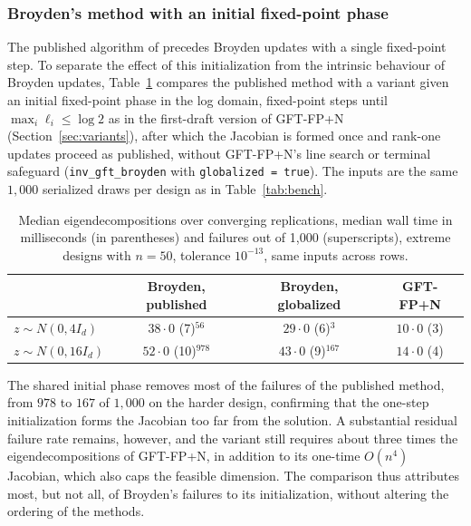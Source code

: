 \documentclass[11pt]{article}
\begin{document}
\subsubsection{Broyden's method with an initial fixed-point phase}\label{sec:s5}

The published algorithm of \citet{ChenFeiYu:2025} precedes Broyden
updates with a single fixed-point step. To separate the effect of this
initialization from the intrinsic behaviour of Broyden updates,
Table~\ref{tab:glob} compares the published method with a variant given
an initial fixed-point phase in the log domain, fixed-point steps
until $\max_i\ell_i\leq\log2$ as in the first-draft version of
GFT-FP+N (Section~\ref{sec:variants}), after which the Jacobian is
formed once and rank-one updates proceed as published, without
GFT-FP+N's line search or terminal safeguard
(\texttt{inv\_gft\_broyden} with \texttt{globalized = true}). The
inputs are the same $1{,}000$ serialized draws per design as in
Table~\ref{tab:bench}.

\begin{table}[h]
\centering
\caption{Median eigendecompositions over converging replications, median
wall time in milliseconds (in parentheses) and failures out of
1{,}000 (superscripts), extreme designs with $n=50$, tolerance
$10^{-13}$, same inputs across rows.}\label{tab:glob}
\medskip
\begin{tabular}{lccc}
\toprule
 & Broyden, published & Broyden, globalized & GFT-FP+N\\
\midrule
$z\sim N(0,4I_d)$  & $38{\cdot}0$ (7)$^{56}$  & $29{\cdot}0$ (6)$^{3}$   & $10{\cdot}0$ (3)\\
$z\sim N(0,16I_d)$ & $52{\cdot}0$ (10)$^{978}$ & $43{\cdot}0$ (9)$^{167}$ & $14{\cdot}0$ (4)\\
\bottomrule
\end{tabular}
\end{table}

The shared initial phase removes most of the failures of the published
method, from $978$ to $167$ of $1{,}000$ on the harder design, confirming
that the one-step initialization forms the Jacobian too far from the
solution. A substantial residual failure rate remains, however, and
the variant still requires about three times the
eigendecompositions of GFT-FP+N, in addition to its one-time
$O(n^{4})$ Jacobian, which also caps the feasible dimension. The
comparison thus attributes most, but not all, of Broyden's failures
to its initialization, without altering the ordering of the methods.
\end{document}
